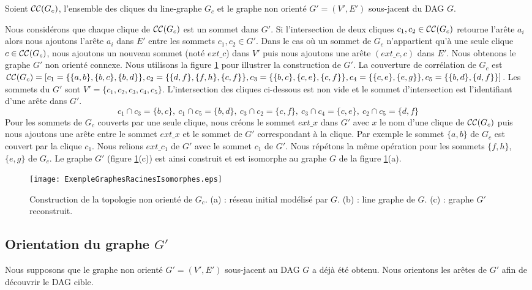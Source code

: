 Soient ${\cal CC}(G_c)$, l'ensemble des cliques du line-graphe $G_c$ et 
le graphe non orient\'e $G'=(V',E')$ sous-jacent du DAG $G$.

Nous consid\'erons que chaque clique de ${\cal CC}(G_c)$ est un sommet dans $G'$.
Si l'intersection de deux cliques $c_1, c_2 \in {\cal CC}(G_c)$ retourne l'ar\^ete $a_i$  alors nous ajoutons  l'ar\^ete $a_i $ dans $E'$ entre les sommets  $c_1, c_2 \in G'$.
Dans  le cas o\`u un sommet de  $G_c$ n'appartient qu'\`a une seule clique $c \in {\cal CC}(G_c)$, nous ajoutons  un nouveau sommet (not\'e $ext\_c$) dans $V'$ puis nous ajoutons une ar\^ete $(ext\_c, c)$ dans $E'$.
Nous obtenons le graphe $G'$ non orient\'e connexe.
Nous utilisons la figure \ref{ExempleGraphesRacinesIsomorphes} pour illustrer la construction de $G'$.
La couverture de corr\'elation de $G_c$ est ${\cal CC}(G_c) = [
 c_1 = \{\{a,b\},\{b,c\},\{b,d\}\}, 
 c_2=\{  \{d,f\},\{f,h\},\{c,f\} \}, 
 c_3 = \{  \{b,c\},\{c,e\},\{c,f\} \}, 
 c_4 = \{  \{c,e\},\{e,g\} \}, 
 c_5 = \{  \{b,d\},\{d,f\} \}]$.
Les sommets du $G'$ sont $V' = \{c_1, c_2, c_3, c_4, c_5\}$.
L'intersection des cliques ci-dessous est non vide et le sommet d'intersection est l'identifiant d'une ar\^ete dans $G'$.
$$
c_1 \cap c_3 = \{b,c\}, ~ 
c_1 \cap c_5 = \{b,d\}, ~ 
c_3 \cap c_2 = \{c,f\}, ~ 
c_3 \cap c_4 =   \{c,e\}, ~ 
c_2 \cap c_5 = \{d,f\}
$$
Pour les sommets de $G_c$ couverts par une seule clique, nous cr\'eons le sommet $ext\_x$ dans $G'$ avec $x$ le nom d'une clique de ${\cal CC}(G_c)$ 
puis nous ajoutons une ar\^ete entre le sommet $ext\_x$ et le sommet de $G'$ correspondant \`a la clique.
Par exemple le sommet $\{a,b\}$ de $G_c$ est couvert par la clique $c_1$. 
Nous relions $ext\_c_1$ de $G'$ avec le sommet $c_1$ de $G'$. 
Nous r\'ep\'etons la m\^eme op\'eration pour les sommets  $\{f,h\}$, $\{e,g\}$ de $G_c$.
Le graphe $G'$ (figure \ref{ExempleGraphesRacinesIsomorphes}(c)) est ainsi construit et est isomorphe au graphe $G$ de la figure \ref{ExempleGraphesRacinesIsomorphes}(a).
\begin{figure}[htb!] 
\centering
\texttt{[image: ExempleGraphesRacinesIsomorphes.eps]}
\caption{ Construction de la topologie non orient\'e de $G_c$.
		(a) : r\'eseau initial mod\'elis\'e par $G$.
		(b) : line graphe de $G$.
		(c) : graphe $G'$ reconstruit.
		 }
\label{ExempleGraphesRacinesIsomorphes}
\end{figure}

\subsection{Orientation du graphe $G'$}
Nous supposons que le graphe non orient\'e $G'=(V',E')$ sous-jacent au DAG $G$ a d\'ej\`a \'et\'e  obtenu. Nous orientons les ar\^etes de $G'$ afin de d\'ecouvrir  le DAG cible.
 \newline
 
